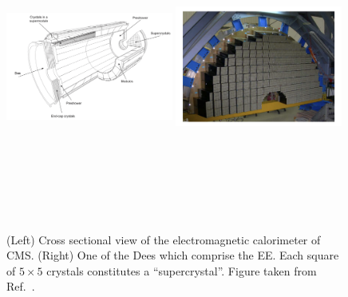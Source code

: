 \begin{figure}[!htb]
    \centering
    \captionsetup{justification=justified}
    \includegraphics[width=0.49\textwidth,height=10cm,keepaspectratio]{figures/cms/ecal/xs_whiteblack.jpeg}
    \includegraphics[width=0.49\textwidth,height=10cm,keepaspectratio]{figures/cms/ecal/dee.jpeg}
    \caption{
        (Left) Cross sectional view of the electromagnetic calorimeter of CMS.
        (Right) One of the Dees which comprise the EE.
        Each square of $ 5 \times 5$ crystals constitutes a ``supercrystal''.
        Figure taken from Ref.~\cite{cms_exp}.
        }
    \label{fig:ecal_xs}
\end{figure}


